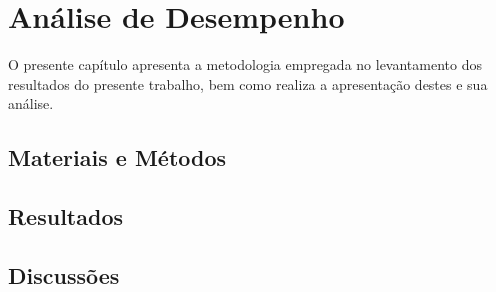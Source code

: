 \chapter{Análise de Desempenho}

O presente capítulo apresenta a metodologia empregada no levantamento dos resultados do presente trabalho, bem como realiza a apresentação destes e sua análise.

\section{Materiais e Métodos}

\section{Resultados}



\section{Discussões}


